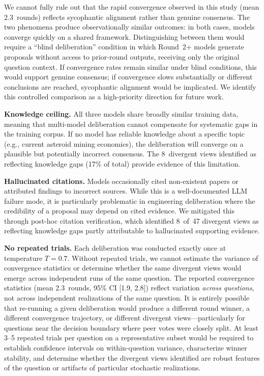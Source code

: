 \documentclass[11pt,a4paper]{article}
\begin{document}
We cannot fully rule out that the rapid convergence observed in this study (mean 2.3~rounds) reflects sycophantic alignment rather than genuine consensus. The two phenomena produce observationally similar outcomes: in both cases, models converge quickly on a shared framework. Distinguishing between them would require a ``blind deliberation'' condition in which Round~2+ models generate proposals without access to prior-round outputs, receiving only the original question context. If convergence rates remain similar under blind conditions, this would support genuine consensus; if convergence slows substantially or different conclusions are reached, sycophantic alignment would be implicated. We identify this controlled comparison as a high-priority direction for future work.

\textbf{Knowledge ceiling.} All three models share broadly similar training data, meaning that multi-model deliberation cannot compensate for systematic gaps in the training corpus. If no model has reliable knowledge about a specific topic (e.g., current asteroid mining economics), the deliberation will converge on a plausible but potentially incorrect consensus. The 8~divergent views identified as reflecting knowledge gaps (17\% of total) provide evidence of this limitation.

\textbf{Hallucinated citations.} Models occasionally cited non-existent papers or attributed findings to incorrect sources. While this is a well-documented LLM failure mode, it is particularly problematic in engineering deliberation where the credibility of a proposal may depend on cited evidence. We mitigated this through post-hoc citation verification, which identified 8~of~47 divergent views as reflecting knowledge gaps partly attributable to hallucinated supporting evidence.

\textbf{No repeated trials.} Each deliberation was conducted exactly once at temperature $T = 0.7$. Without repeated trials, we cannot estimate the variance of convergence statistics or determine whether the same divergent views would emerge across independent runs of the same question. The reported convergence statistics (mean 2.3~rounds, 95\% CI [1.9, 2.8]) reflect variation \emph{across questions}, not across independent realizations of the same question. It is entirely possible that re-running a given deliberation would produce a different round winner, a different convergence trajectory, or different divergent views---particularly for questions near the decision boundary where peer votes were closely split. At least 3--5 repeated trials per question on a representative subset would be required to establish confidence intervals on within-question variance, characterize winner stability, and determine whether the divergent views identified are robust features of the question or artifacts of particular stochastic realizations.
\end{document}
